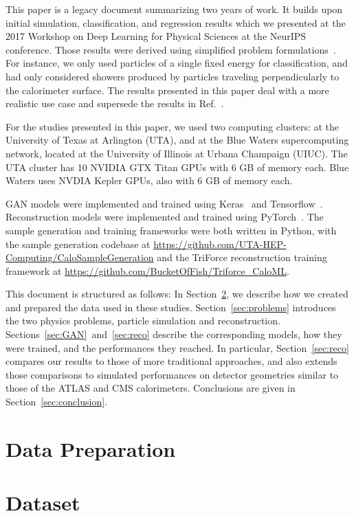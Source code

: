 This paper is a legacy document summarizing two years of work. It builds upon initial simulation, classification, and regression results which we presented at the 2017 Workshop on Deep Learning for Physical Sciences at the NeurIPS conference. Those results were derived using simplified problem formulations~\cite{Mau2017}.  For instance, we only used particles of a single fixed energy for classification, and had only considered showers produced by particles traveling perpendicularly to the calorimeter surface. The results presented in this paper deal with a more realistic use case and supersede the results in Ref.~\cite{Mau2017}. 

For the studies presented in this paper, we used two computing clusters: at the University of Texas at Arlington (UTA), and at the Blue Waters supercomputing network, located at the University of Illinois at Urbana Champaign (UIUC). The UTA cluster has 10 NVIDIA GTX Titan GPUs with 6 GB of memory each. Blue Waters uses NVDIA Kepler GPUs, also with 6 GB of memory each. 

GAN models were implemented and trained using Keras~\cite{keras} and  Tensorflow~\cite{tensorflow2015-whitepaper}. Reconstruction models were implemented and trained using PyTorch~\cite{PyTorch}. The sample generation and training frameworks were both written in Python, with the sample generation codebase at \url{https://github.com/UTA-HEP-Computing/CaloSampleGeneration} and the TriForce reconstruction training framework at \url{https://github.com/BucketOfFish/Triforce_CaloML}.

This document is structured as follows: In Section~\ref{sec:data}, we describe how we created and prepared the data used in these studies. Section~\ref{sec:problems} introduces the two physics problems, particle simulation and reconstruction. Sections~\ref{sec:GAN}~and~\ref{sec:reco} describe the corresponding models, how they were trained, and the performances they reached. In particular, Section~\ref{sec:reco} compares our results to those of more traditional approaches, and also extends those comparisons to simulated performances on detector geometries similar to those of the ATLAS and CMS calorimeters. Conclusions are given in Section~\ref{sec:conclusion}.

\section{Data Preparation}

\section{Dataset}\label{sec:data}

